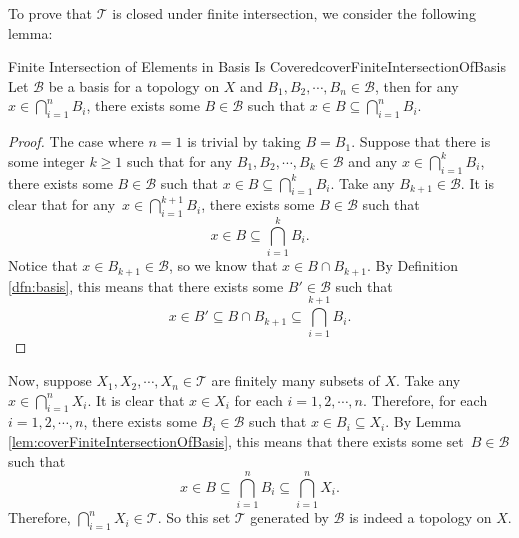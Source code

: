 \documentclass[math, code]{amznotes}
\theoremstyle{remark}
\begin{document}
To prove that $\mathcal{T}$ is closed under finite intersection, we consider the following lemma:
\begin{lembox}{Finite Intersection of Elements in Basis Is Covered}{coverFiniteIntersectionOfBasis}
    Let $\mathcal{B}$ be a basis for a topology on $X$ and $B_1, B_2, \cdots, B_n \in \mathcal{B}$, then for any $x \in \bigcap_{i = 1}^nB_i$, there exists some $B \in \mathcal{B}$ such that $x \in B \subseteq \bigcap_{i = 1}^nB_i$.
    \tcblower
    \begin{proof}
        The case where $n = 1$ is trivial by taking $B = B_1$. Suppose that there is some integer $k \geq 1$ such that for any $B_1, B_2, \cdots, B_k \in \mathcal{B}$ and any $x \in \bigcap_{i = 1}^kB_i$, there exists some $B \in \mathcal{B}$ such that $x \in B \subseteq \bigcap_{i = 1}^kB_i$. Take any $B_{k + 1} \in \mathcal{B}$. It is clear that for any~$x \in \bigcap_{i = 1}^{k + 1}B_i$, there exists some $B \in \mathcal{B}$ such that 
        \begin{equation*}
            x \in B \subseteq \bigcap_{i = 1}^kB_i.
        \end{equation*}
        Notice that $x \in B_{k + 1} \in \mathcal{B}$, so we know that $x \in B \cap B_{k + 1}$. By Definition \ref{dfn:basis}, this means that there exists some $B' \in \mathcal{B}$ such that 
        \begin{equation*}
            x \in B' \subseteq B \cap B_{k + 1} \subseteq \bigcap_{i = 1}^{k + 1}B_i.
        \end{equation*}
    \end{proof}
\end{lembox}
Now, suppose $X_1, X_2, \cdots, X_n \in \mathcal{T}$ are finitely many subsets of $X$. Take any $x \in \bigcap_{i = 1}^nX_i$. It is clear that $x \in X_i$ for each $i = 1, 2, \cdots, n$. Therefore, for each $i = 1, 2, \cdots, n$, there exists some $B_i \in \mathcal{B}$ such that $x \in B_i \subseteq X_i$. By Lemma \ref{lem:coverFiniteIntersectionOfBasis}, this means that there exists some set~$B \in \mathcal{B}$ such that 
\begin{equation*}
    x \in B \subseteq \bigcap_{i = 1}^nB_i \subseteq \bigcap_{i = 1}^nX_i.    
\end{equation*}
Therefore, $\bigcap_{i = 1}^nX_i \in \mathcal{T}$. So this set $\mathcal{T}$ generated by $\mathcal{B}$ is indeed a topology on $X$. 
\end{document}
